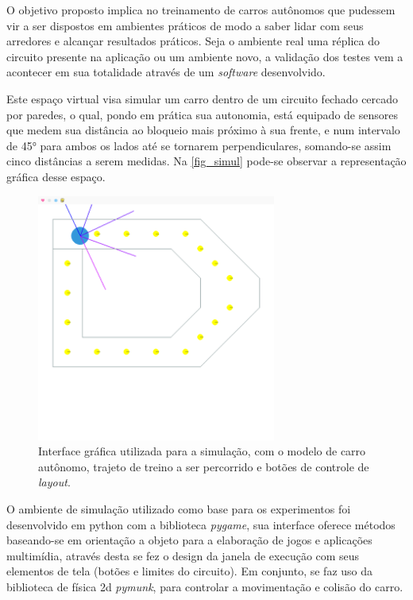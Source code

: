 O objetivo proposto implica no treinamento de carros autônomos
que pudessem vir a ser dispostos em ambientes práticos de modo
a saber lidar com seus arredores e alcançar resultados
práticos. Seja o ambiente real uma réplica do circuito
presente na aplicação ou um ambiente novo, a validação dos
testes vem a acontecer em sua totalidade através de um
\textit{software} desenvolvido.

Este espaço virtual visa simular um carro dentro de um
circuito fechado cercado por paredes, o qual, pondo em prática
sua autonomia, está equipado de sensores que medem sua
distância ao bloqueio mais próximo à sua frente, e num
intervalo de 45° para ambos os lados até se tornarem
perpendiculares, somando-se assim cinco distâncias a serem
medidas. Na \autoref{fig_simul} pode-se observar a representa{\c c}{\~a}o gr{\'a}fica desse espa{\c c}o.

\begin{figure}[htb]
        \centering
        \caption{\label{fig_simul}Interface gráfica utilizada para a simulação, com o modelo de carro autônomo, trajeto de treino a ser percorrido e botões de controle de \textit{layout}.}
        \includegraphics[width=0.7\textwidth]{images/simul.png}
\end{figure}

O ambiente de simulação utilizado como base para os
experimentos foi desenvolvido em python com a biblioteca
\textit{pygame}, sua interface oferece métodos baseando-se em
orientação a objeto para a elaboração de jogos e aplicações
multimídia, através desta se fez o design da janela de
execução com seus elementos de tela (botões e limites do
circuito). Em conjunto, se faz uso da biblioteca de física 2d
\textit{pymunk}, para controlar a movimentação e colisão do carro.

